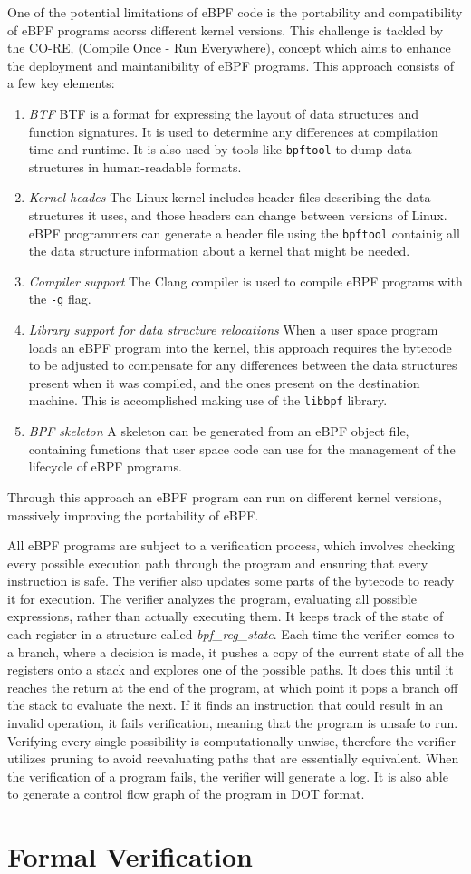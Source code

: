 One of the potential limitations of eBPF code is the portability and compatibility of eBPF programs acorss different kernel versions. This challenge is tackled by the CO-RE, (Compile Once - Run Everywhere), concept which aims to enhance the deployment and maintanibility of eBPF programs. This approach consists of a few key elements:
\begin{enumerate}
    \item \textit{BTF} BTF is a format for expressing the layout of data structures and function signatures. It is used to determine any differences at compilation time and runtime. It is also used by tools like \texttt{bpftool} to dump data structures in human-readable formats. 
    \item \textit{Kernel heades} The Linux kernel includes header files describing the data structures it uses, and those headers can change between versions of Linux. eBPF programmers can generate a header file using the \texttt{bpftool} containig all the data structure information about a kernel that might be needed. 
    \item \textit{Compiler support} The Clang compiler is used to compile eBPF programs with the \texttt{-g} flag. 
    \item \textit{Library support for data structure relocations} When a user space program loads an eBPF program into the kernel, this approach requires the bytecode to be adjusted to compensate for any differences between the data structures present when it was compiled, and the ones present on the destination machine. This is accomplished making use of the \texttt{libbpf} library. 
    \item \textit{BPF skeleton} A skeleton can be generated from an eBPF object file, containing functions that user space code can use for the management of the lifecycle of eBPF programs. 
\end{enumerate}
Through this approach an eBPF program can run on different kernel versions, massively improving the portability of eBPF. 

All eBPF programs are subject to a verification process, which involves checking every possible execution path through the program and ensuring that every instruction is safe. The verifier also updates some parts of the bytecode to ready it for execution.
The verifier analyzes the program, evaluating all possible expressions, rather than actually executing them. It keeps track of the state of each register in a structure called \textit{bpf_reg_state}. Each time the verifier comes to a branch, where a decision is made, it pushes a copy of the current state of all the registers onto a stack and explores one of the possible paths. It does this until it reaches the return at the end of the program, at which point it pops a branch off the stack to evaluate the next. If it finds an instruction that could result in an invalid operation, it fails verification, meaning that the program is unsafe to run. 
Verifying every single possibility is computationally unwise, therefore the verifier utilizes pruning to avoid reevaluating paths that are essentially equivalent. 
When the verification of a program fails, the verifier will generate a log. It is also able to generate a control flow graph of the program in DOT format.

\section{Formal Verification}

